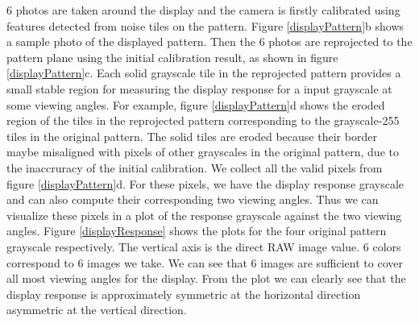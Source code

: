 \documentclass{report}
\begin{document}
6 photos are taken around the display and the camera is firstly calibrated using features detected from noise tiles on the pattern. Figure \ref{displayPattern}b shows a sample photo of the displayed pattern. Then the 6 photos are reprojected to the pattern plane using the initial calibration result, as shown in figure \ref{displayPattern}c. Each solid grayscale tile in the reprojected pattern provides a small stable region for measuring the display response for a input grayscale at some viewing angles. For example, figure \ref{displayPattern}d shows the eroded region of the tiles in the reprojected pattern corresponding to the grayscale-255 tiles in the original pattern. The solid tiles are eroded because their border maybe misaligned with pixels of other grayscales in the original pattern, due to the inaccruracy of the initial calibration. We collect all the valid pixels from figure \ref{displayPattern}d. For these pixels, we have the display response grayscale and can also compute their corresponding two viewing angles. Thus we can visualize these pixels in a plot of the response grayscale against the two viewing angles. Figure \ref{displayResponse} shows the plots for the four original pattern grayscale respectively. The vertical axis is the direct RAW image value. 6 colors correspond to 6 images we take. We can see that 6 images are sufficient to cover all most viewing angles for the display. From the plot we can clearly see that the display response is approximately symmetric at the horizontal direction asymmetric at the vertical direction. 
\end{document}
